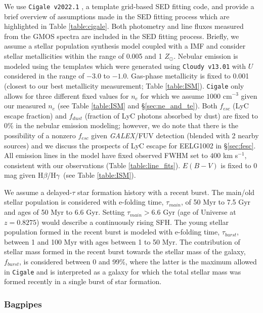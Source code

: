 \documentclass[twocolumn,tight,times,linenumbers]{aastex631}
\newcommand{\hbeta}{H$\beta$}
\newcommand{\hgamma}{H$\gamma$}
\begin{document}
		We use \texttt{Cigale v2022.1} \citep{Boquien2019,Yang2022}, a template grid-based SED fitting code, and provide a brief overview of assumptions made in the SED fitting process which are highlighted in Table \ref{table:cigale}. Both photometry and line fluxes measured from the GMOS spectra are included in the SED fitting process. Briefly, we assume a \cite{Bruzual2003} stellar population synthesis model coupled with a \cite{Chabrier2003} IMF and consider stellar metallicities within the range of 0.005 and 1 $Z_\odot$. Nebular emission is modeled using the \cite{Inoue2011} templates which were generated using \texttt{Cloudy v13.01} \citep{Ferland2013} with $U$ considered in the range of $-3.0$ to $-1.0$. Gas-phase metallicity is fixed to 0.001 (closest to our best metallicity measurement; Table \ref{table:ISM}). \texttt{Cigale} only allows for three different fixed values for $n_e$ for which we assume $1000$ cm$^{-3}$ given our measured $n_e$ (see Table \ref{table:ISM} and \S\ref{sec:ne_and_te}). Both $f_{esc} $ (LyC escape fraction) and $f_{dust}$ (fraction of LyC photons absorbed by dust) are fixed to $0$\% in the nebular emission modeling; however, we do note that there is the possibility of a nonzero $f_{esc}$ given \textit{GALEX}/FUV detection (blended with 2 nearby sources) and we discuss the prospects of LyC escape for EELG1002 in \S\ref{sec:fesc}. All emission lines in the model have fixed observed FWHM set to $400$ km s$^{-1}$, consistent with our observations (Table \ref{table:line_fits}). $E(B-V)$ is fixed to 0 mag given \hbeta/\hgamma~(see Table \ref{table:ISM}).

		We assume a delayed-$\tau$ star formation history with a recent burst. The main/old stellar population is considered with e-folding time, $\tau_{main}$, of 50 Myr to 7.5 Gyr and ages of 50 Myr to 6.6 Gyr. Setting $\tau_{main} > 6.6$ Gyr (age of Universe at $z = 0.8275$) would describe a continuously rising SFH. The young stellar population formed in the recent burst is modeled with e-folding time, $\tau_{burst}$, between 1 and 100 Myr with ages between 1 to 50 Myr. The contribution of stellar mass formed in the recent burst towards the stellar mass of the galaxy, $f_{burst}$, is considered between 0 and 99\%, where the latter is the maximum allowed in \texttt{Cigale} and is interpreted as a galaxy for which the total stellar mass was formed recently in a single burst of star formation.

		\subsubsection{Bagpipes}
		\label{sec:bagpipes}
		
\end{document}
